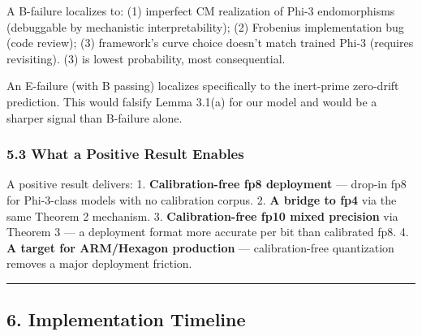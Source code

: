 \documentclass[
  11pt,
]{article}
\begin{document}
A B-failure localizes to: (1) imperfect CM realization of Phi-3
endomorphisms (debuggable by mechanistic interpretability); (2)
Frobenius implementation bug (code review); (3) framework's curve choice
doesn't match trained Phi-3 (requires revisiting). (3) is lowest
probability, most consequential.

An E-failure (with B passing) localizes specifically to the inert-prime
zero-drift prediction. This would falsify Lemma 3.1(a) for our model and
would be a sharper signal than B-failure alone.

\hypertarget{what-a-positive-result-enables}{%
\subsubsection{5.3 What a Positive Result
Enables}\label{what-a-positive-result-enables}}

A positive result delivers: 1. \textbf{Calibration-free fp8 deployment}
--- drop-in fp8 for Phi-3-class models with no calibration corpus. 2.
\textbf{A bridge to fp4} via the same Theorem 2 mechanism. 3.
\textbf{Calibration-free fp10 mixed precision} via Theorem 3 --- a
deployment format more accurate per bit than calibrated fp8. 4.
\textbf{A target for ARM/Hexagon production} --- calibration-free
quantization removes a major deployment friction.

\begin{center}\rule{0.5\linewidth}{0.5pt}\end{center}

\hypertarget{implementation-timeline}{%
\subsection{6. Implementation Timeline}\label{implementation-timeline}}
\end{document}
